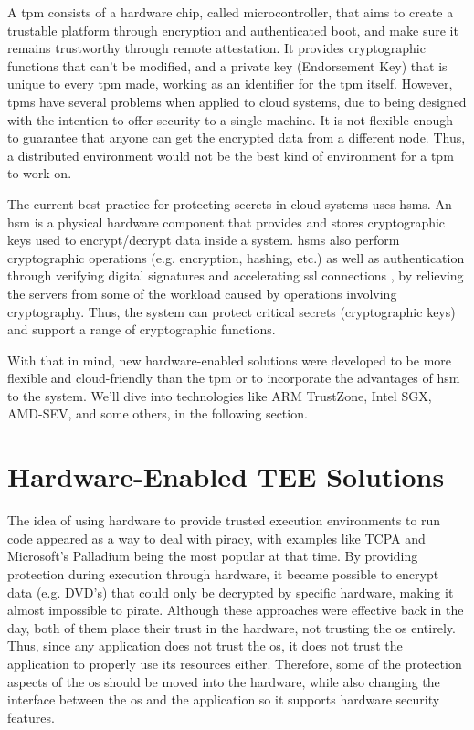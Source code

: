 A \gls{tpm} \cite{tpmPaper} consists of a hardware chip, called microcontroller, that aims to create a trustable platform through encryption and authenticated boot, and make sure it remains trustworthy through remote attestation. 
It provides cryptographic functions that can't be modified, and a private key (Endorsement Key) that is unique to every \gls{tpm} made, working as an identifier for the \gls{tpm} itself.
However, \gls{tpm}s have several problems when applied to cloud systems, due to being designed with the intention to offer security to a single machine. It is not flexible enough to guarantee that anyone can get the encrypted data from a different node.
Thus, a distributed environment would not be the best kind of environment for a \gls{tpm} to work on.

The current best practice for protecting secrets in  cloud systems uses \gls{hsm}s. 
An \gls{hsm} \cite{hsmPaper} is a physical hardware component that provides and stores cryptographic keys used to encrypt/decrypt data inside a system. \gls{hsm}s also perform cryptographic operations (e.g. encryption, hashing, etc.) as well as authentication through verifying digital signatures and accelerating \gls{ssl} connections \cite{hsmThesis}, by relieving the servers from some of the workload caused by operations involving cryptography. 
Thus, the system can protect critical secrets (cryptographic keys) and support a range of cryptographic functions.

With that in mind, new hardware-enabled solutions were developed to be more flexible and cloud-friendly than the \gls{tpm} or to incorporate the advantages of \gls{hsm} to the system. We'll dive into technologies like ARM TrustZone, Intel SGX, AMD-SEV, and some others, in the following section.




\section{Hardware-Enabled TEE Solutions}
\label{sec:hardwareTEEs}

The idea of using hardware to provide trusted execution environments to run code appeared as a way to deal with piracy, with examples like TCPA \cite{tcpaPaper} and Microsoft's Palladium \cite{microsoftPalladium} being the most popular at that time. By providing protection during execution through hardware, it became possible to encrypt data (e.g. DVD's) that could only be decrypted by specific hardware, making it almost impossible to pirate. 
Although these approaches were effective back in the day, both of them place their trust in the hardware, not trusting the \gls{os} entirely. 
Thus, since any application does not trust the \gls{os}, it does not trust the application to properly use its resources either. Therefore, some of the protection aspects of the \gls{os} should be moved into the hardware, while also changing the interface between the \gls{os} and the application so it supports hardware security features. 

